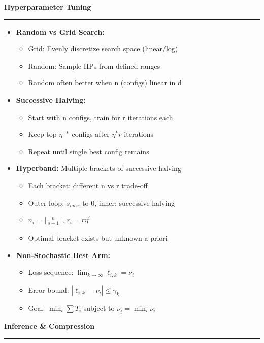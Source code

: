 \documentclass[8pt,letter,landscape]{article}
\newcommand{\sectiontitle}[1]{\textbf{\large #1}\vspace{0.2em}\hrule\vspace{0.5em}}
\begin{document}
\begin{multicols*}{3}
\sectiontitle{Hyperparameter Tuning}
\begin{itemize}[leftmargin=*,nosep]
    \item \textbf{Random vs Grid Search:}
    \begin{itemize}[leftmargin=*,nosep]
        \item Grid: Evenly discretize search space (linear/log)
        \item Random: Sample HPs from defined ranges
        \item Random often better when n (configs) linear in d
    \end{itemize}
    
    \item \textbf{Successive Halving:}
    \begin{itemize}[leftmargin=*,nosep]
        \item Start with n configs, train for r iterations each
        \item Keep top $\eta^{-k}$ configs after $\eta^k r$ iterations
        \item Repeat until single best config remains
    \end{itemize}
    
    \item \textbf{Hyperband:} Multiple brackets of successive halving
    \begin{itemize}[leftmargin=*,nosep]
        \item Each bracket: different n vs r trade-off
        \item Outer loop: $s_{max}$ to 0, inner: successive halving
        \item $n_i = \lfloor\frac{n}{s+1}\rfloor$, $r_i = r\eta^i$
        \item Optimal bracket exists but unknown a priori
    \end{itemize}

    \item \textbf{Non-Stochastic Best Arm:}
    \begin{itemize}[leftmargin=*,nosep]
        \item Loss sequence: $\lim_{k\to\infty} \ell_{i,k} = \nu_i$
        \item Error bound: $|\ell_{i,k} - \nu_i| \leq \gamma_k$ 
        \item Goal: $\min_i \sum T_i$ subject to $\nu_{\hat{i}} = \min_i \nu_i$
    \end{itemize}
\end{itemize}

\sectiontitle{Inference \& Compression}


\end{multicols*}
\end{document}
